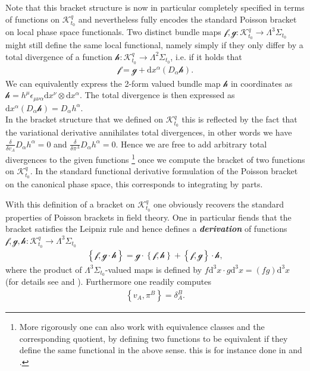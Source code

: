 \documentclass[a4paper,12pt, DIV=14, BCOR=5mm, twoside, headsepline, numbers=noenddot]{scrbook}
\begin{document}
Note that this bracket structure is now in particular completely specified in terms of functions on $\mathcal{K}^q_{t_0}$ and nevertheless fully encodes the standard Poisson bracket on local phase space functionals. Two distinct bundle maps $\mathcal{f},\mathcal{g} : \mathcal{K}^q_{t_0} \rightarrow \Lambda^3\Sigma_{t_0}$ might still define the same local functional, namely simply if they only differ by a total divergence of a function $\mathcal{h}: \mathcal{K}^q_{t_0} \rightarrow \Lambda^2\Sigma_{t_0}$, i.e. if it holds that 
\begin{align}
\mathcal{f} = \mathcal{g} +\mathrm{d}x^{\alpha}(D_{\alpha} \mathcal{h}).
\end{align}
We can equivalently express the 2-form valued bundle map $\mathcal{h}$ in coordinates as $\mathcal{h} = h^{\mu} \epsilon_{\mu \nu \alpha} \mathrm{d}x^{\nu} \otimes \mathrm{d}x^{\alpha}$. The total divergence is then expressed as $\mathrm{d}x^{\alpha}(D_{\alpha} \mathcal{h}) = D_{\alpha} h^{\alpha}$. \\

In the bracket structure that we defined on $\mathcal{K}^q_{t_0}$ this is reflected by the fact that the variational derivative annihilates total divergences, in other words we have $\frac{\delta}{\delta v_A}D_{\alpha} h^{\alpha} = 0$ and $\frac{\delta}{\delta \pi^A}D_{\alpha} h^{\alpha}=0$. Hence we are free to add arbitrary total divergences to the given functions \footnote{More rigorously one can also work with equivalence classes and the corresponding quotient, by defining two functions to be equivalent if they define the same functional in the above sense. this is for instance done in \cite{1997hep.th....9164B} and \cite{Barnich1998}.} once we compute the bracket of two functions on $\mathcal{K}^q_{t_0}$. In the standard functional derivative formulation of the Poisson bracket on the canonical phase space, this corresponds to integrating by parts. 

With this definition of a bracket on $\mathcal{K}^q_{t_0}$ one obviously recovers the standard properties of Poisson brackets in field theory.
One in particular fiends that the bracket satisfies the Leipniz rule and hence defines a \textit{\textbf{derivation}} of functions $\mathcal{f},\mathcal{g},\mathcal{h} : \mathcal{K}^q_{t_0} \rightarrow \Lambda^3\Sigma_{t_0}$ 
\begin{align}
\left \{\mathcal{f}, \mathcal{g}\cdot \mathcal{h} \right \} = \mathcal{g} \cdot \left \{ \mathcal{f}, \mathcal{h} \right \} + \left \{ \mathcal{f} , \mathcal{g}\right \} \cdot \mathcal{h},
\end{align}
where the product of $\Lambda^3\Sigma_{t_0}$-valued maps is defined by $f \mathrm{d}^3x \cdot g\mathrm{d}^3x = (fg)\mathrm{d}^3x$ (for details see \cite{1997hep.th....9164B} and \cite{Barnich1998}). Furthermore one readily computes 
\begin{align}
\left \{ v_A, \pi^B\right \} = \delta_A^B.
\end{align}
\end{document}
